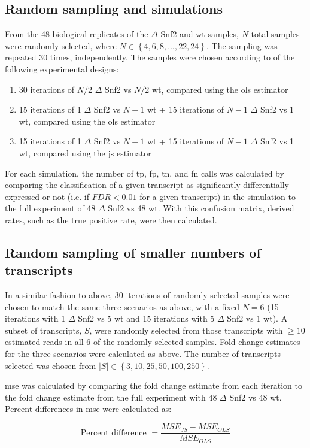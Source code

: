 \subsection{Random sampling and simulations}

From the 48 biological replicates of the $\Delta$ Snf2 and \gls{wt} samples, $N$ total samples were randomly selected, where $N \in \left\{4, 6, 8, ..., 22, 24 \right\}$.
The sampling was repeated 30 times, independently.
The samples were chosen according to of the following experimental designs:

\begin{enumerate}
  \item 30 iterations of $N/2$ $\Delta$ Snf2 vs $N/2$ \gls{wt}, compared using the \gls{ols} estimator
  \item 15 iterations of 1 $\Delta$ Snf2 vs $N - 1$ \gls{wt} + 15 iterations of $N - 1$ $\Delta$ Snf2 vs 1 \gls{wt}, compared using the \gls{ols} estimator
  \item 15 iterations of 1 $\Delta$ Snf2 vs $N - 1$ \gls{wt} + 15 iterations of $N - 1$ $\Delta$ Snf2 vs 1 \gls{wt}, compared using the \gls{js} estimator
\end{enumerate}

For each simulation, the number of \gls{tp}, \gls{fp}, \gls{tn}, and \gls{fn} calls was calculated by comparing the classification of a given transcript as significantly differentially expressed or not (i.e. if $FDR < 0.01$ for a given transcript) in the simulation to the full experiment of 48 $\Delta$ Snf2 vs 48 \gls{wt}.
With this confusion matrix, derived rates, such as the true positive rate, were then calculated.

\subsection{Random sampling of smaller numbers of transcripts}

In a similar fashion to above, 30 iterations of randomly selected samples were chosen to match the same three scenarios as above, with a fixed $N = 6$ (15 iterations with 1 $\Delta$ Snf2 vs 5 \gls{wt} and 15 iterations with 5 $\Delta$ Snf2 vs 1 \gls{wt}).
A subset of transcripts, $S$, were randomly selected from those transcripts with $\ge 10$ estimated reads in all 6 of the randomly selected samples.
Fold change estimates for the three scenarios were calculated as above.
The number of transcripts selected was chosen from $|S| \in \left\{3, 10, 25, 50, 100, 250 \right\}$.

\Gls{mse} was calculated by comparing the fold change estimate from each iteration to the fold change estimate from the full experiment with 48 $\Delta$ Snf2 vs 48 \gls{wt}.
Percent differences in \gls{mse} were calculated as:

\begin{equation*}
  \text{Percent difference } = \frac{MSE_{JS} - MSE_{OLS}}{MSE_{OLS}}
\end{equation*}
